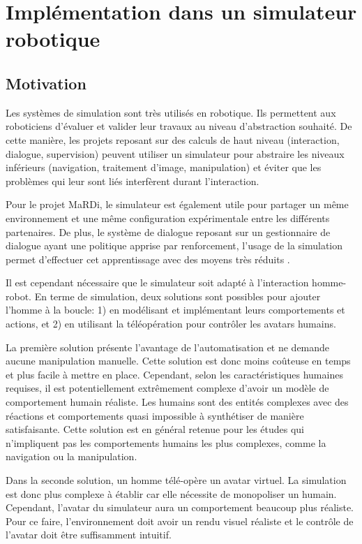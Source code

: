 \documentclass[a4paper,11pt,twoside]{StyleThese}
\begin{document}
\section{Implémentation dans un simulateur robotique}

\subsection{Motivation}
Les systèmes de simulation sont très utilisés en robotique. Ils permettent aux roboticiens d'évaluer et valider leur travaux au niveau d'abstraction souhaité. De cette manière, les projets reposant sur des calculs de haut niveau (interaction, dialogue, supervision) peuvent utiliser un simulateur pour abstraire les niveaux inférieurs (navigation, traitement d'image, manipulation) et éviter que les problèmes qui leur sont liés interfèrent durant l'interaction.

Pour le projet MaRDi, le simulateur est également utile pour partager un même environnement et une même configuration expérimentale entre les différents partenaires. De plus, le système de dialogue reposant sur un gestionnaire de dialogue ayant une politique apprise par renforcement, l'usage de la simulation permet d'effectuer cet apprentissage avec des moyens très réduits \cite{simpar_2014}.

Il est cependant nécessaire que le simulateur soit adapté à l'interaction homme-robot. 
En terme de simulation, deux solutions sont possibles pour ajouter l'homme à la boucle: 1) en modélisant et implémentant leurs comportements et actions, et 2) en utilisant la téléopération pour contrôler les avatars humains.

La première solution présente l'avantage de l'automatisation et ne demande aucune manipulation manuelle. Cette solution est donc moins coûteuse en temps et plus facile à mettre en place. Cependant, selon les caractéristiques humaines requises, il est potentiellement extrêmement complexe d'avoir un modèle de comportement humain réaliste. Les humains sont des entités complexes avec des réactions et comportements quasi impossible à synthétiser de manière satisfaisante. Cette solution est en général retenue pour les études qui n'impliquent pas les comportements humains les plus complexes, comme la navigation ou la manipulation.

Dans la seconde solution, un homme télé-opère un avatar virtuel. La simulation est donc plus complexe à établir car elle nécessite de monopoliser un humain. Cependant, l'avatar du simulateur aura un comportement beaucoup plus réaliste. Pour ce faire, l'environnement doit avoir un rendu visuel réaliste et le contrôle de l'avatar doit être suffisamment intuitif.
\end{document}
